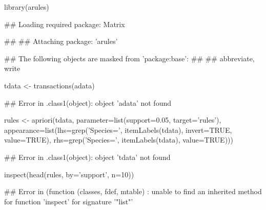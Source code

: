 \begin{Schunk}
% --begin: "casestudy-assoc-arules"
\begin{Sinput}
library(arules)
\end{Sinput}
\begin{Soutput}
## Loading required package: Matrix
\end{Soutput}
\begin{Soutput}
## 
## Attaching package: 'arules'
\end{Soutput}
\begin{Soutput}
## The following objects are masked from 'package:base':
## 
##     abbreviate, write
\end{Soutput}
\begin{Sinput}
tdata <- transactions(adata)
\end{Sinput}
\begin{Soutput}
## Error in .class1(object): object 'adata' not found
\end{Soutput}
\begin{Sinput}
rules <- apriori(tdata, 
                 parameter=list(support=0.05,
                                target='rules'),
                 appearance=list(lhs=grep('Species=', itemLabels(tdata), invert=TRUE, value=TRUE),
                                 rhs=grep('Species=', itemLabels(tdata), value=TRUE)))
\end{Sinput}
\begin{Soutput}
## Error in .class1(object): object 'tdata' not found
\end{Soutput}
\begin{Sinput}
inspect(head(rules, by='support', n=10))
\end{Sinput}
\begin{Soutput}
## Error in (function (classes, fdef, mtable) : unable to find an inherited method for function 'inspect' for signature '"list"'
\end{Soutput}
%
% --end: "casestudy-assoc-arules"
\end{Schunk}
